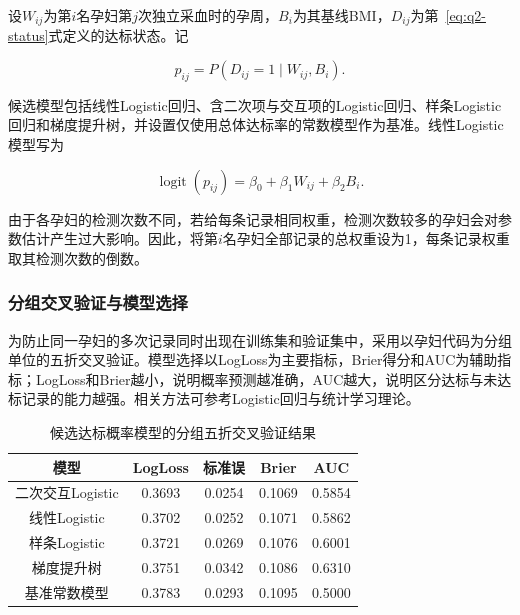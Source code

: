 设$W_{ij}$为第$i$名孕妇第$j$次独立采血时的孕周，$B_i$为其基线BMI，$D_{ij}$为第~\ref{eq:q2-status}式定义的达标状态。记

\begin{equation}
  p_{ij}=P\!\left(D_{ij}=1\mid W_{ij},B_i\right).
  \label{eq:q2-probability}
\end{equation}

候选模型包括线性Logistic回归、含二次项与交互项的Logistic回归、样条Logistic回归和梯度提升树，并设置仅使用总体达标率的常数模型作为基准。线性Logistic模型写为

\begin{equation}
  \operatorname{logit}(p_{ij})
  =\beta_0+\beta_1W_{ij}+\beta_2B_i.
  \label{eq:q2-logistic}
\end{equation}

由于各孕妇的检测次数不同，若给每条记录相同权重，检测次数较多的孕妇会对参数估计产生过大影响。因此，将第$i$名孕妇全部记录的总权重设为1，每条记录权重取其检测次数的倒数。

\subsubsection{分组交叉验证与模型选择}

为防止同一孕妇的多次记录同时出现在训练集和验证集中，采用以孕妇代码为分组单位的五折交叉验证。模型选择以LogLoss为主要指标，Brier得分和AUC为辅助指标；LogLoss和Brier越小，说明概率预测越准确，AUC越大，说明区分达标与未达标记录的能力越强。相关方法可参考Logistic回归与统计学习理论\cite{hosmer2013applied,hastie2009elements}。

\begin{table}[H]
  \centering
  \caption{候选达标概率模型的分组五折交叉验证结果}
  \label{tab:q2-model-cv}
  \begin{tabular}{ccccc}
    \toprule
    模型 & LogLoss & 标准误 & Brier & AUC \\
    \midrule
    二次交互Logistic & 0.3693 & 0.0254 & 0.1069 & 0.5854 \\
    线性Logistic & 0.3702 & 0.0252 & 0.1071 & 0.5862 \\
    样条Logistic & 0.3721 & 0.0269 & 0.1076 & 0.6001 \\
    梯度提升树 & 0.3751 & 0.0342 & 0.1086 & 0.6310 \\
    基准常数模型 & 0.3783 & 0.0293 & 0.1095 & 0.5000 \\
    \bottomrule
  \end{tabular}
\end{table}

